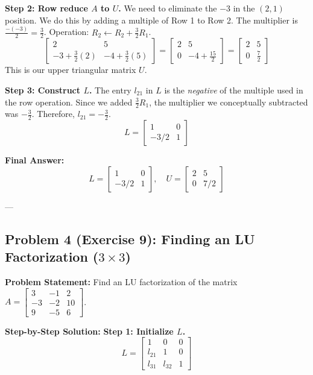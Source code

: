 \documentclass[11pt]{article}
\begin{document}
\textbf{Step 2: Row reduce $A$ to $U$.}
We need to eliminate the $-3$ in the $(2,1)$ position. We do this by adding a multiple of Row 1 to Row 2.
The multiplier is $\frac{-(-3)}{2} = \frac{3}{2}$.
Operation: $R_2 \leftarrow R_2 + \frac{3}{2}R_1$.
\[ \begin{bmatrix} 2 & 5 \\ -3 + \frac{3}{2}(2) & -4 + \frac{3}{2}(5) \end{bmatrix} = \begin{bmatrix} 2 & 5 \\ 0 & -4 + \frac{15}{2} \end{bmatrix} = \begin{bmatrix} 2 & 5 \\ 0 & \frac{7}{2} \end{bmatrix} \]
This is our upper triangular matrix $U$.

\textbf{Step 3: Construct $L$.}
The entry $l_{21}$ in $L$ is the \textit{negative} of the multiple used in the row operation. Since we added $\frac{3}{2}R_1$, the multiplier we conceptually subtracted was $-\frac{3}{2}$. Therefore, $l_{21} = -\frac{3}{2}$.
\[ L = \begin{bmatrix} 1 & 0 \\ -3/2 & 1 \end{bmatrix} \]

\textbf{Final Answer:}
\[ L = \begin{bmatrix} 1 & 0 \\ -3/2 & 1 \end{bmatrix}, \quad U = \begin{bmatrix} 2 & 5 \\ 0 & 7/2 \end{bmatrix} \]

---

\subsection{Problem 4 (Exercise 9): Finding an LU Factorization ($3 \times 3$)}
\textbf{Problem Statement:} Find an LU factorization of the matrix $A = \begin{bmatrix} 3 & -1 & 2 \\ -3 & -2 & 10 \\ 9 & -5 & 6 \end{bmatrix}$.

\textbf{Step-by-Step Solution:}
\textbf{Step 1: Initialize $L$.}
\[ L = \begin{bmatrix} 1 & 0 & 0 \\ l_{21} & 1 & 0 \\ l_{31} & l_{32} & 1 \end{bmatrix} \]
\end{document}
